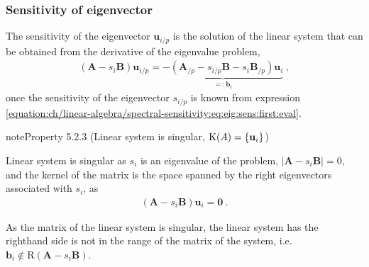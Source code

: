 \documentclass[letterpaper,10pt,english]{jupyterBook}
\begin{document}
\subsubsection{Sensitivity of eigenvector}
\label{\detokenize{ch/linear-algebra/spectral-sensitivity:sensitivity-of-eigenvector}}
\sphinxAtStartPar
The sensitivity of the eigenvector \(\mathbf{u}_{i/p}\) is the solution of the linear system that can be obtained from the derivative of the eigenvalue problem,
\begin{equation*}
\begin{split}(\mathbf{A} - s_i \mathbf{B} ) \mathbf{u}_{i/p} = \underbrace{- ( \mathbf{A}_{/p} - s_{i/p} \mathbf{B} - s_i \mathbf{B}_{/p}) \mathbf{u}_i}_{=:\mathbf{b}_i} \ ,\end{split}
\end{equation*}
\sphinxAtStartPar
once the sensitivity of the eigenvector \(s_{i/p}\) is known from expression \eqref{equation:ch/linear-algebra/spectral-sensitivity:eq:eig:sens:first:eval}.
\label{ch/linear-algebra/spectral-sensitivity:property-2}
\begin{sphinxadmonition}{note}{Property 5.2.3 (Linear system is singular, \protect\( \text{K}(A) = \{ \mathbf{u}_i \}\protect\))}



\sphinxAtStartPar
Linear system is singular as \(s_i\) is an eigenvalue of the problem, \(|\mathbf{A} - s_i \mathbf{B}| = 0\), and the kernel of the matrix is the space spanned by the right eigenvectors associated with \(s_i\), as
\begin{equation*}
\begin{split}\left( \mathbf{A} - s_i \mathbf{B} \right) \mathbf{u}_i = \mathbf{0} \ .\end{split}
\end{equation*}\end{sphinxadmonition}

\sphinxAtStartPar
As the matrix of the linear system is singular, the linear system has  the right\sphinxhyphen{}hand side is not in the range of the matrix of the system, i.e. \(\mathbf{b}_i \notin \text{R}(\mathbf{A}-s_i \mathbf{B})\).
\end{document}
